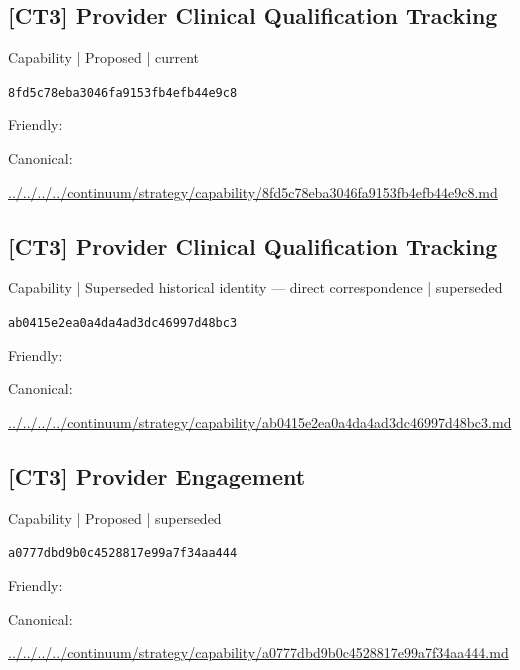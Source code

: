 \documentclass[10pt,a4paper]{article}
\begin{document}
\subsection*{[CT3] Provider Clinical Qualification Tracking}
{\small Capability | Proposed | current}\par
\texttt{8fd5c78eba3046fa9153fb4efb44e9c8}\par
Friendly: \par
Canonical: \par
{\footnotesize\url{../../../../continuum/strategy/capability/8fd5c78eba3046fa9153fb4efb44e9c8.md}}\par
\subsection*{[CT3] Provider Clinical Qualification Tracking}
{\small Capability | Superseded historical identity — direct correspondence | superseded}\par
\texttt{ab0415e2ea0a4da4ad3dc46997d48bc3}\par
Friendly: \par
Canonical: \par
{\footnotesize\url{../../../../continuum/strategy/capability/ab0415e2ea0a4da4ad3dc46997d48bc3.md}}\par
\subsection*{[CT3] Provider Engagement}
{\small Capability | Proposed | superseded}\par
\texttt{a0777dbd9b0c4528817e99a7f34aa444}\par
Friendly: \par
Canonical: \par
{\footnotesize\url{../../../../continuum/strategy/capability/a0777dbd9b0c4528817e99a7f34aa444.md}}\par
\end{document}
